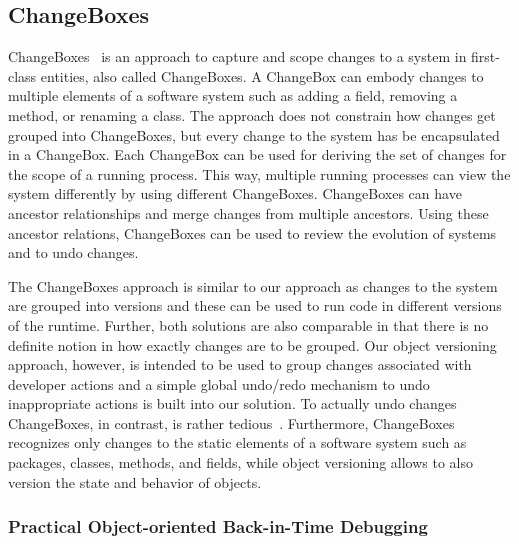 \subsection{ChangeBoxes}

ChangeBoxes~\cite{Denker2007EEC} is an approach to capture and scope changes to a system in first-class entities, also called ChangeBoxes.
A ChangeBox can embody changes to multiple elements of a software system such as adding a field, removing a method, or renaming a class.
The approach does not constrain how changes get grouped into ChangeBoxes, but every change to the system has be encapsulated in a ChangeBox.
Each ChangeBox can be used for deriving the set of changes for the scope of a running process.
This way, multiple running processes can view the system differently by using different ChangeBoxes.
ChangeBoxes can have ancestor relationships and merge changes from multiple ancestors.
Using these ancestor relations, ChangeBoxes can be used to review the evolution of systems and to undo changes.

The ChangeBoxes approach is similar to our approach as changes to the system are grouped into versions and these can be used to run code in different versions of the runtime.
Further, both solutions are also comparable in that there is no definite notion in how exactly changes are to be grouped.
Our object versioning approach, however, is intended to be used to group changes associated with developer actions and a simple global undo/redo mechanism to undo inappropriate actions is built into our solution.
To actually undo changes ChangeBoxes, in contrast, is rather tedious~\cite{Steinert2012COE}.
Furthermore, ChangeBoxes recognizes only changes to the static elements of a software system such as packages, classes, methods, and fields, while object versioning allows to also version the state and behavior of objects.


\subsubsection{Practical Object-oriented Back-in-Time Debugging}

